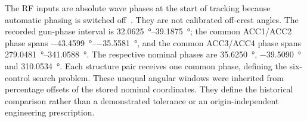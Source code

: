 The RF inputs are absolute wave phases at the start of tracking because automatic phasing is
switched off~\cite{Floettmann2017Astra}. They are not calibrated off-crest angles. The recorded
gun-phase interval is \SIrange{32.0625}{39.1875}{\degree}; the common ACC1/ACC2 phase spans
\SIrange{-43.4599}{-35.5581}{\degree}, and the common ACC3/ACC4 phase spans
\SIrange{279.0481}{341.0588}{\degree}. The respective nominal phases are
\SI{35.6250}{\degree}, \SI{-39.5090}{\degree} and \SI{310.0534}{\degree}.
Each structure pair receives one common phase, defining the six-control search problem.
These unequal angular windows were inherited from percentage offsets of the stored nominal
coordinates. They define the historical comparison rather than a demonstrated tolerance or an
origin-independent engineering prescription.
